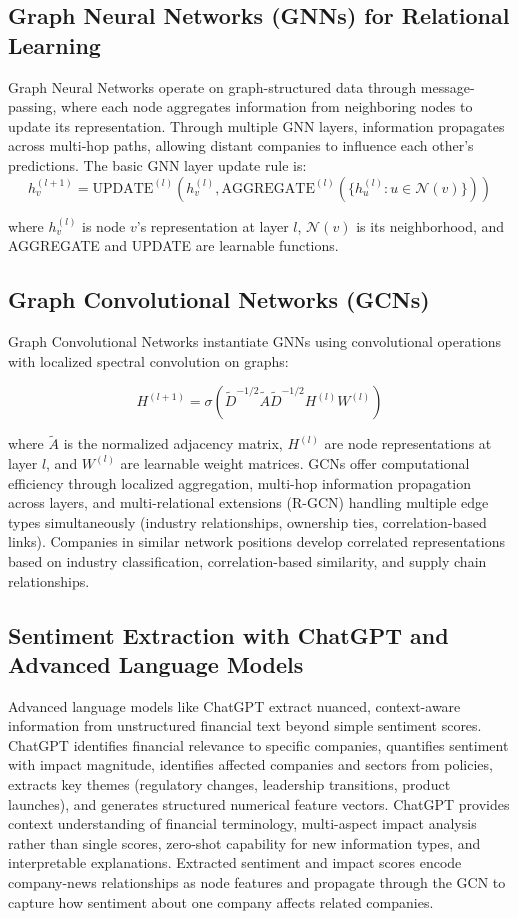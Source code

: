 \subsection{Graph Neural Networks (GNNs) for Relational Learning}

Graph Neural Networks operate on graph-structured data through message-passing, where each node aggregates information from neighboring nodes to update its representation. Through multiple GNN layers, information propagates across multi-hop paths, allowing distant companies to influence each other's predictions. The basic GNN layer update rule is:
$$h_v^{(l+1)} = \text{UPDATE}^{(l)}\left(h_v^{(l)}, \text{AGGREGATE}^{(l)}(\{h_u^{(l)} : u \in \mathcal{N}(v)\})\right)$$

where $h_v^{(l)}$ is node $v$'s representation at layer $l$, $\mathcal{N}(v)$ is its neighborhood, and AGGREGATE and UPDATE are learnable functions.

\subsection{Graph Convolutional Networks (GCNs)}

Graph Convolutional Networks instantiate GNNs using convolutional operations with localized spectral convolution on graphs:

$$H^{(l+1)} = \sigma\left(\tilde{D}^{-1/2}\tilde{A}\tilde{D}^{-1/2}H^{(l)}W^{(l)}\right)$$

where $\tilde{A}$ is the normalized adjacency matrix, $H^{(l)}$ are node representations at layer $l$, and $W^{(l)}$ are learnable weight matrices. GCNs offer computational efficiency through localized aggregation, multi-hop information propagation across layers, and multi-relational extensions (R-GCN) handling multiple edge types simultaneously (industry relationships, ownership ties, correlation-based links). Companies in similar network positions develop correlated representations based on industry classification, correlation-based similarity, and supply chain relationships.

\subsection{Sentiment Extraction with ChatGPT and Advanced Language Models}

Advanced language models like ChatGPT extract nuanced, context-aware information from unstructured financial text beyond simple sentiment scores. ChatGPT identifies financial relevance to specific companies, quantifies sentiment with impact magnitude, identifies affected companies and sectors from policies, extracts key themes (regulatory changes, leadership transitions, product launches), and generates structured numerical feature vectors. ChatGPT provides context understanding of financial terminology, multi-aspect impact analysis rather than single scores, zero-shot capability for new information types, and interpretable explanations. Extracted sentiment and impact scores encode company-news relationships as node features and propagate through the GCN to capture how sentiment about one company affects related companies.

